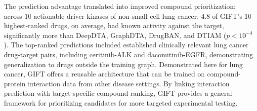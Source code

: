 The prediction advantage translated into improved compound prioritization: across 10 actionable driver kinases of non-small cell lung cancer, $4.8$ of GIFT's 10 highest-ranked drugs, on average, had known activity against the target, significantly more than DeepDTA, GraphDTA, DrugBAN, and DTIAM ($p<10^{-4}$). The top-ranked predictions included established clinically relevant lung cancer drug-target pairs, including ceritinib-ALK and dacomitinib-EGFR, demonstrating generalization to drugs outside the training graph. Demonstrated here for lung cancer, GIFT offers a reusable architecture that can be trained on compound-protein interaction data from other disease settings. By linking interaction prediction with target-specific compound ranking, GIFT provides a general framework for prioritizing candidates for more targeted experimental testing.
